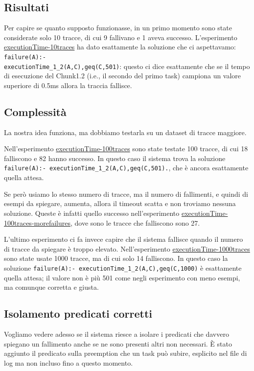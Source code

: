 \subsection{Risultati}
Per capire se quanto supposto funzionasse, in un primo momento sono state considerate solo 10 tracce, di cui 9 fallivano e 1 aveva successo. L'esperimento \href{https://github.com/edoardosarri24/prediction-in-data-driven-system/8-executionTime-10traces/}{executionTime-10traces} ha dato esattamente la soluzione che ci aspettavamo: \texttt{failure(A):- \\ executionTime\_1\_2(A,C),geq(C,501)}: questo ci dice esattamente che se il tempo di esecuzione del Chunk1.2 (i.e., il secondo del primo task) campiona un valore superiore di 0.5ms allora la traccia fallisce.

\subsection{Complessità}
La nostra idea funziona, ma dobbiamo testarla su un dataset di tracce maggiore.

Nell'esperimento \href{https://github.com/edoardosarri24/prediction-in-data-driven-system/9-executionTime-100traces/}{executionTime-100traces} sono state testate 100 tracce, di cui 18 falliscono e 82 hanno successo. In questo caso il sistema trova la soluzione \texttt{failure(A):- executionTime\_1\_2(A,C),geq(C,501).}, che è ancora esattamente quella attesa.

Se però usiamo lo stesso numero di tracce, ma il numero di fallimenti, e quindi di esempi da spiegare, aumenta, allora il timeout scatta e non troviamo nessuna soluzione. Queste è infatti quello successo nell'esperimento \href{https://github.com/edoardosarri24/prediction-in-data-driven-system/10-executionTime-100traces-morefailures/}{executionTime-100traces-morefailures}, dove sono le tracce che falliscono sono 27.

L'ultimo esperimento ci fa invece capire che il sistema fallisce quando il numero di tracce da spiegare è troppo elevato. Nell'esperimento \href{https://github.com/edoardosarri24/prediction-in-data-driven-system/11-executionTime-1000traces/}{executionTime-1000traces} sono state usate 1000 tracce, ma di cui solo 14 falliscono. In questo caso la soluzione \texttt{failure(A):- executionTime\_1\_2(A,C),geq(C,1000)} è esattamente quella attesa; il valore non è più 501 come negli esperimento con meno esempi, ma comunque corretta e giusta.

\subsection{Isolamento predicati corretti}
\label{subsec:preempt}
Vogliamo vedere adesso se il sistema riesce a isolare i predicati che davvero spiegano un fallimento anche se ne sono presenti altri non necessari. È stato aggiunto il predicato sulla preemption che un task può subire, esplicito nel file di log ma non incluso fino a questo momento.

